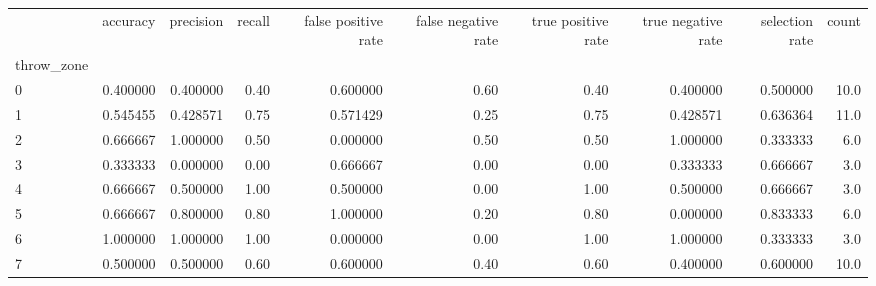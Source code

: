 \begin{tabular}{lrrrrrrrrr}
\toprule
{} &  accuracy &  precision &  recall &  false positive rate &  false negative rate &  true positive rate &  true negative rate &  selection rate &  count \\
throw\_zone &           &            &         &                      &                      &                     &                     &                 &        \\
\midrule
0          &  0.400000 &   0.400000 &    0.40 &             0.600000 &                 0.60 &                0.40 &            0.400000 &        0.500000 &   10.0 \\
1          &  0.545455 &   0.428571 &    0.75 &             0.571429 &                 0.25 &                0.75 &            0.428571 &        0.636364 &   11.0 \\
2          &  0.666667 &   1.000000 &    0.50 &             0.000000 &                 0.50 &                0.50 &            1.000000 &        0.333333 &    6.0 \\
3          &  0.333333 &   0.000000 &    0.00 &             0.666667 &                 0.00 &                0.00 &            0.333333 &        0.666667 &    3.0 \\
4          &  0.666667 &   0.500000 &    1.00 &             0.500000 &                 0.00 &                1.00 &            0.500000 &        0.666667 &    3.0 \\
5          &  0.666667 &   0.800000 &    0.80 &             1.000000 &                 0.20 &                0.80 &            0.000000 &        0.833333 &    6.0 \\
6          &  1.000000 &   1.000000 &    1.00 &             0.000000 &                 0.00 &                1.00 &            1.000000 &        0.333333 &    3.0 \\
7          &  0.500000 &   0.500000 &    0.60 &             0.600000 &                 0.40 &                0.60 &            0.400000 &        0.600000 &   10.0 \\
\bottomrule
\end{tabular}
